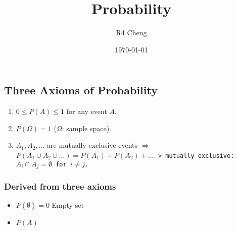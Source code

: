 \documentclass[12pt,a4paper]{article}
\title{Probability}
\author{R4 Cheng}
\date{\today}
\begin{document}
\maketitle

\subsection*{Three Axioms of Probability}

\begin{enumerate}
    \item $0 \leq P(A) \leq 1$ for any event $A$.
    \item $P(\Omega) = 1$ ($\Omega$: sample space).
    \item $A_1, A_2, \dots$ are mutually exclusive events $\Rightarrow$ $P(A_1 \cup A_2 \cup \dots) = P(A_1) + P(A_2) + \dots$.
    \texttt{> mutually exclusive: $A_i \cap A_j = \emptyset$ for $i \neq j$.}
\end{enumerate}

\subsubsection*{Derived from three axioms}

\begin{itemize}
    \item $P(\emptyset) = 0$ Empty set
    \item $P(A)$
\end{itemize}
\end{document}
